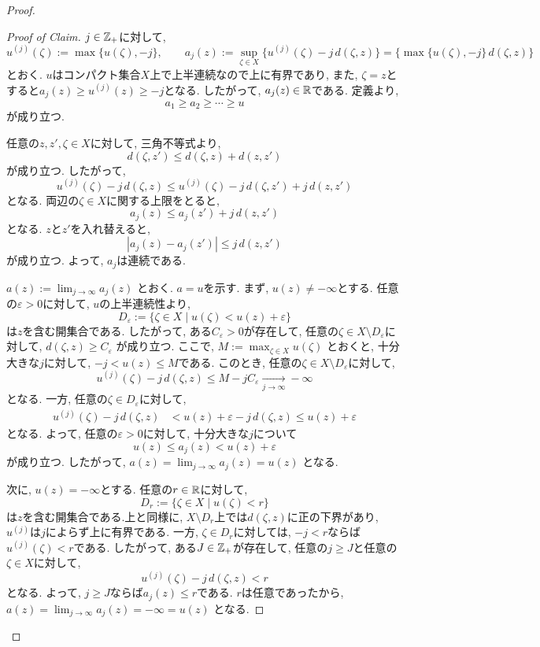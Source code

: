 \begin{proof}
\begin{proof}[Proof of Claim]
$j \in \mathbb{Z}_+$に対して,
\[
u^{(j)}(\zeta):=\max\{u(\zeta),-j\},
\qquad
a_j(z):=\sup_{\zeta \in X}
\bigl\{u^{(j)}(\zeta)-j\,d(\zeta,z)\bigr\}
=
\bigl\{\max\{u(\zeta),-j\}\,d(\zeta,z)\bigr\}
\]
とおく.
$u$はコンパクト集合$X$上で上半連続なので上に有界であり,
また, $\zeta=z$とすると$a_j(z)\geq u^{(j)}(z)\geq -j$となる.
したがって, $a_j(z) \in \mathbb{R}$である.
定義より,
\[
a_1 \geq a_2 \geq \cdots \geq u
\]
が成り立つ.

任意の$z,z',\zeta \in X$に対して,
三角不等式より,
\[
d(\zeta,z') \leq d(\zeta,z)+d(z,z')
\]
が成り立つ.
したがって,
\[
u^{(j)}(\zeta)-j\,d(\zeta,z)
\leq
u^{(j)}(\zeta)-j\,d(\zeta,z')+j\,d(z,z')
\]
となる.
両辺の$\zeta \in X$に関する上限をとると,
\[
a_j(z) \leq a_j(z')+j\,d(z,z')
\]
となる.
$z$と$z'$を入れ替えると,
\[
|a_j(z)-a_j(z')| \leq j\,d(z,z')
\]
が成り立つ.
よって, $a_j$は連続である.

\(
a(z):=\lim_{j \to \infty}a_j(z)
\)
とおく. $a=u$を示す.
まず, $u(z) \neq -\infty$とする.
任意の$\varepsilon > 0$に対して,
$u$の上半連続性より,
\[
D_\varepsilon
:=
\{\zeta \in X \mid u(\zeta)<u(z)+\varepsilon\}
\]
は$z$を含む開集合である.
したがって, ある$C_\varepsilon > 0$が存在して,
任意の$\zeta \in X \setminus D_\varepsilon$に対して,
\(
d(\zeta,z) \geq C_\varepsilon
\)
が成り立つ.
ここで,
\(
M:=\max_{\zeta \in X}u(\zeta)
\)
とおくと, 十分大きな$j$に対して, $-j<u(z)\leq M$である.
このとき, 任意の$\zeta \in X \setminus D_\varepsilon$に対して,
\[
u^{(j)}(\zeta)-j\,d(\zeta,z)
\leq
M-jC_\varepsilon
\xrightarrow[j \to \infty]{} -\infty
\]
となる.
一方, 任意の$\zeta \in D_\varepsilon$に対して,
\[
\begin{aligned}
u^{(j)}(\zeta)-j\,d(\zeta,z)
&<
u(z)+\varepsilon-j\,d(\zeta,z)
\leq u(z)+\varepsilon
\end{aligned}
\]
となる.
よって, 任意の$\varepsilon > 0$に対して,
十分大きな$j$について
\[
u(z) \leq a_j(z) < u(z)+\varepsilon
\]
が成り立つ.
したがって,
\(
a(z)=\lim_{j \to \infty}a_j(z)=u(z)
\)
となる.

次に, $u(z)=-\infty$とする.
任意の$r \in \mathbb{R}$に対して,
\[
D_r:=\{\zeta \in X \mid u(\zeta)<r\}
\]
は$z$を含む開集合である.上と同様に, $X \setminus D_r$上では$d(\zeta,z)$に正の下界があり,
$u^{(j)}$は$j$によらず上に有界である.
一方, $\zeta \in D_r$に対しては,
$-j<r$ならば$u^{(j)}(\zeta)<r$である.
したがって, ある$J \in \mathbb{Z}_+$が存在して,
任意の$j \geq J$と任意の$\zeta \in X$に対して,
\[
u^{(j)}(\zeta)-j\,d(\zeta,z)<r
\]
となる.
よって, $j \geq J$ならば$a_j(z)\leq r$である.
$r$は任意であったから,
\(
a(z)=\lim_{j \to \infty}a_j(z)=-\infty=u(z)
\)
となる.
\end{proof}


\end{proof}
